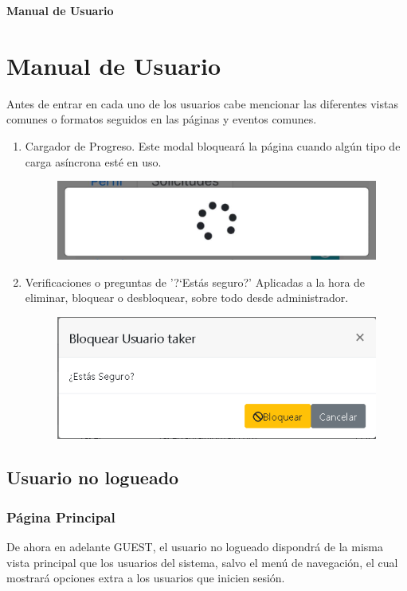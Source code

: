 \newpage{\pagestyle{empty}\cleardoublepage}
\newpage
\vspace*{\fill}
    \begin{center}
      \thispagestyle{empty} \vspace*{0cm} \textbf{\huge
Manual de Usuario}
    \end{center}
    \vspace*{\fill}
\newpage{\pagestyle{empty}\cleardoublepage}
\chapter{Manual de Usuario}

Antes de entrar en cada uno de los usuarios cabe mencionar las diferentes vistas comunes o formatos seguidos en las p\'{a}ginas y eventos comunes.

\begin{enumerate}
\item Cargador de Progreso. Este modal bloquear\'{a} la p\'{a}gina cuando alg\'{u}n tipo de carga as\'{i}ncrona est\'{e} en uso. 
\begin{figure}[h!]
\centering
\includegraphics[width=.2\textwidth]{Img/ManualUsuario/PROGRESS_SPINNER.png}
\end{figure}
\item Verificaciones o preguntas de '?`Est\'{a}s seguro?' Aplicadas a la hora de eliminar, bloquear o desbloquear, sobre todo desde administrador.
\begin{figure}[h!]
\centering
\includegraphics[width=.6\textwidth]{Img/ManualUsuario/ADMIN_BLOCK_USER.png}
\end{figure}
\end{enumerate}


\section{Usuario no logueado}
\subsection{P\'{a}gina Principal}
De ahora en adelante GUEST, el usuario no logueado dispondr\'{a} de la misma vista principal que los usuarios del sistema, salvo el men\'{u} de navegaci\'{o}n, el cual mostrar\'{a} opciones extra a los usuarios que inicien sesi\'{o}n.\\

